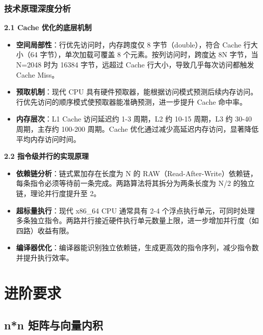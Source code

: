 ﻿\documentclass[9pt,a4paper]{article}
\begin{document}
\subsubsection{技术原理深度分析}
\textbf{2.1 Cache 优化的底层机制}
\begin{itemize}
    \item \textbf{空间局部性}：行优先访问时，内存跨度仅 8 字节（double），符合 Cache 行大小（64 字节），单次加载可覆盖 8 个元素。按列访问时，跨度达 8N 字节，当 N=2048 时为 16384 字节，远超过 Cache 行大小，导致几乎每次访问都触发 Cache Miss。
    \item \textbf{预取机制}：现代 CPU 具有硬件预取器，能根据访问模式预测后续内存访问。行优先访问的顺序模式使预取器能准确预测，进一步提升 Cache 命中率。
    \item \textbf{内存层次}：L1 Cache 访问延迟约 1-3 周期，L2 约 10-15 周期，L3 约 30-40 周期，主存约 100-200 周期。Cache 优化通过减少高延迟内存访问，显著降低平均内存访问时间。
\end{itemize}

\textbf{2.2 指令级并行的实现原理}
\begin{itemize}
    \item \textbf{依赖链分析}：链式累加存在长度为 N 的 RAW（Read-After-Write）依赖链，每条指令必须等待前一条完成。两路算法将其拆分为两条长度为 N/2 的独立链，理论并行度提升至 2。
    \item \textbf{超标量执行}：现代 x86\_64 CPU 通常具有 2-4 个浮点执行单元，可同时处理多条独立指令。两路并行接近硬件执行单元数量上限，进一步增加并行度（如四路）收益有限。
    \item \textbf{编译器优化}：编译器能识别独立依赖链，生成更高效的指令序列，减少指令数并提升执行效率。
\end{itemize}

\section{进阶要求}
\subsection{n*n 矩阵与向量内积}
\end{document}
